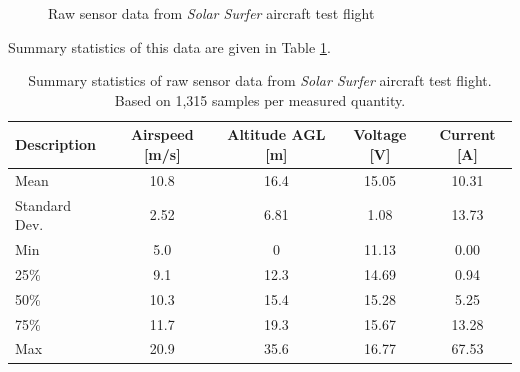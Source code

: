 \begin{figure}[h]
    \centering
    \caption{Raw sensor data from \emph{Solar Surfer} aircraft test flight}
    \label{fig:raw_flight_data}
\end{figure}

Summary statistics of this data are given in Table \ref{tab:aircraft_stats}.

\begin{table}[h]
    \centering
    \caption{Summary statistics of raw sensor data from \emph{Solar Surfer} aircraft test flight. Based on 1,315 samples per measured quantity.}
    \begin{tabular}{lcccc}
        \toprule
        Description   & Airspeed [m/s] & Altitude AGL [m] & Voltage [V] & Current [A] \\ \midrule
        Mean          & 10.8           & 16.4             & 15.05       & 10.31       \\
        Standard Dev. & 2.52           & 6.81             & 1.08        & 13.73       \\
        Min           & 5.0            & 0                & 11.13       & 0.00        \\
        25\%          & 9.1            & 12.3             & 14.69       & 0.94        \\
        50\%          & 10.3           & 15.4             & 15.28       & 5.25        \\
        75\%          & 11.7           & 19.3             & 15.67       & 13.28       \\
        Max           & 20.9           & 35.6             & 16.77       & 67.53       \\ \bottomrule
    \end{tabular}
    \label{tab:aircraft_stats}
\end{table}

